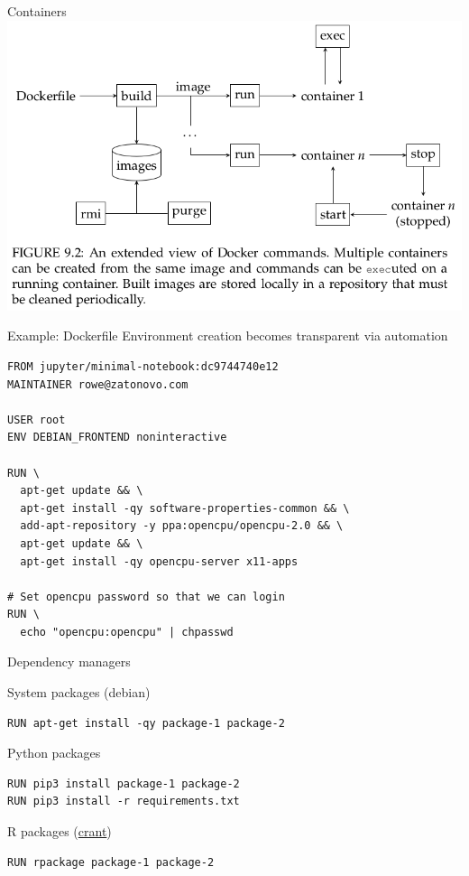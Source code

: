 \documentclass{beamer}
\begin{document}
\begin{frame}{Containers}
\includegraphics[width=\linewidth]{images/docker_commands}
\end{frame}


\begin{frame}[fragile]{Example: Dockerfile}
Environment creation becomes transparent via automation

\small
\begin{lstlisting}[style=custombash]
FROM jupyter/minimal-notebook:dc9744740e12
MAINTAINER rowe@zatonovo.com

USER root
ENV DEBIAN_FRONTEND noninteractive

RUN \
  apt-get update && \
  apt-get install -qy software-properties-common && \
  add-apt-repository -y ppa:opencpu/opencpu-2.0 && \
  apt-get update && \
  apt-get install -qy opencpu-server x11-apps

# Set opencpu password so that we can login
RUN \
  echo "opencpu:opencpu" | chpasswd
\end{lstlisting}
\end{frame}


\begin{frame}[fragile]{Dependency managers}

System packages (debian)

\small
\begin{lstlisting}[style=custombash]
RUN apt-get install -qy package-1 package-2
\end{lstlisting}

Python packages

\begin{lstlisting}[style=custombash]
RUN pip3 install package-1 package-2
RUN pip3 install -r requirements.txt
\end{lstlisting}

R packages (\href{https://github.com/zatonovo/crant}{crant})

\begin{lstlisting}[style=custombash]
RUN rpackage package-1 package-2
\end{lstlisting}


\end{frame}
\end{document}

